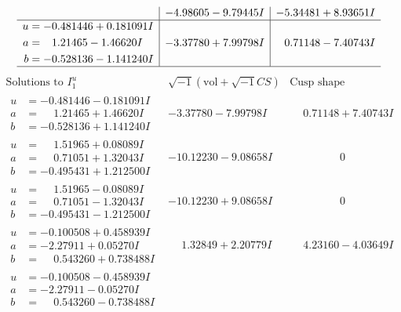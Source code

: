 \documentclass[1p]{elsarticle_modified}
\theoremstyle{definition}
\newcommand{\I}{\sqrt{-1}}
\begin{document}
$$\begin{array}{c|c|c}
 & -4.98605 - 9.79445 I & -5.34481 + 8.93651 I \\ \hline\begin{aligned}
u &= -0.481446 + 0.181091 I \\
a &= \phantom{-}1.21465 - 1.46620 I \\
b &= -0.528136 - 1.141240 I\end{aligned}
 & -3.37780 + 7.99798 I & \phantom{-}0.71148 - 7.40743 I\\
 \hline 
 \end{array}$$\newpage$$\begin{array}{c|c|c}  
\text{Solutions to }I^u_{1}& \I (\text{vol} + \sqrt{-1}CS) & \text{Cusp shape}\\
 \hline 
\begin{aligned}
u &= -0.481446 - 0.181091 I \\
a &= \phantom{-}1.21465 + 1.46620 I \\
b &= -0.528136 + 1.141240 I\end{aligned}
 & -3.37780 - 7.99798 I & \phantom{-}0.71148 + 7.40743 I \\ \hline\begin{aligned}
u &= \phantom{-}1.51965 + 0.08089 I \\
a &= \phantom{-}0.71051 + 1.32043 I \\
b &= -0.495431 + 1.212500 I\end{aligned}
 & -10.12230 - 9.08658 I & \phantom{-0.000000 } 0 \\ \hline\begin{aligned}
u &= \phantom{-}1.51965 - 0.08089 I \\
a &= \phantom{-}0.71051 - 1.32043 I \\
b &= -0.495431 - 1.212500 I\end{aligned}
 & -10.12230 + 9.08658 I & \phantom{-0.000000 } 0 \\ \hline\begin{aligned}
u &= -0.100508 + 0.458939 I \\
a &= -2.27911 + 0.05270 I \\
b &= \phantom{-}0.543260 + 0.738488 I\end{aligned}
 & \phantom{-}1.32849 + 2.20779 I & \phantom{-}4.23160 - 4.03649 I \\ \hline\begin{aligned}
u &= -0.100508 - 0.458939 I \\
a &= -2.27911 - 0.05270 I \\
b &= \phantom{-}0.543260 - 0.738488 I\end{aligned}

\end{array}$$
\end{document}
